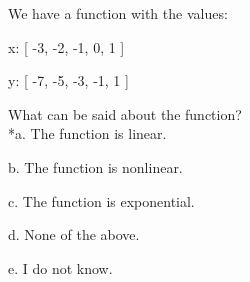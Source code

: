 
We have a function with the values: 

	x: [ -3, -2, -1, 0, 1 ]

	y: [ -7, -5, -3, -1, 1 ]

What can be said about the function? \\

*a. The function is linear.

b. The function is nonlinear.

c.  The function is exponential.

d. None of the above. 

e. I do not know. \\
